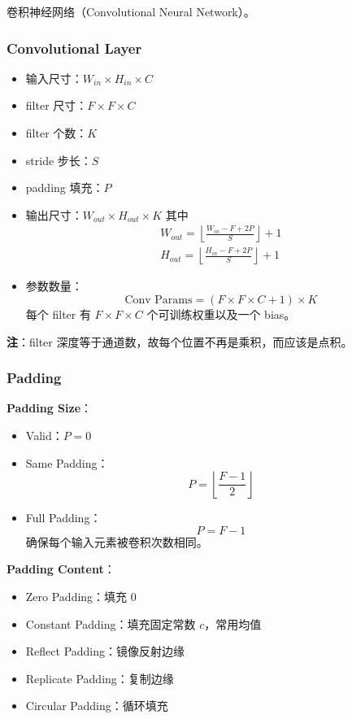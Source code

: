 卷积神经网络（Convolutional Neural Network）。

\subsubsection{Convolutional Layer}\label{convolutional-layer}

\begin{itemize}
\tightlist
\item
  输入尺寸：\(W_{in} \times H_{in} \times C\)
\item
  filter 尺寸：\(F \times F \times C\)
\item
  filter 个数：\(K\)
\item
  stride 步长：\(S\)
\item
  padding 填充：\(P\)
\item
  输出尺寸：\(W_{out} \times H_{out} \times K\) 其中 \[
    \begin{aligned}
    W_{out} = \left\lfloor\frac{W_{in} - F + 2P}{S}\right\rfloor + 1 \\
    H_{out} = \left\lfloor\frac{H_{in} - F + 2P}{S}\right\rfloor + 1
    \end{aligned}
    \]
\item
  参数数量： \[
    \text{Conv Params} = (F \times F \times C + 1) \times K
    \] 每个 filter 有 \(F \times F \times C\) 个可训练权重以及一个
  bias。
\end{itemize}

\textbf{注}：filter 深度等于通道数，故每个位置不再是乘积，而应该是点积。

\subsubsection{Padding}\label{padding}

\textbf{Padding Size}：

\begin{itemize}
\tightlist
\item
  Valid：\(P = 0\)
\item
  Same Padding： \[
    P = \left\lfloor\frac{F-1}{2}\right\rfloor
    \]
\item
  Full Padding： \[
    P = F - 1
    \] 确保每个输入元素被卷积次数相同。
\end{itemize}

\textbf{Padding Content}：

\begin{itemize}
\tightlist
\item
  Zero Padding：填充 \(0\)
\item
  Constant Padding：填充固定常数 \(c\)，常用均值
\item
  Reflect Padding：镜像反射边缘
\item
  Replicate Padding：复制边缘
\item
  Circular Padding：循环填充
\end{itemize}

